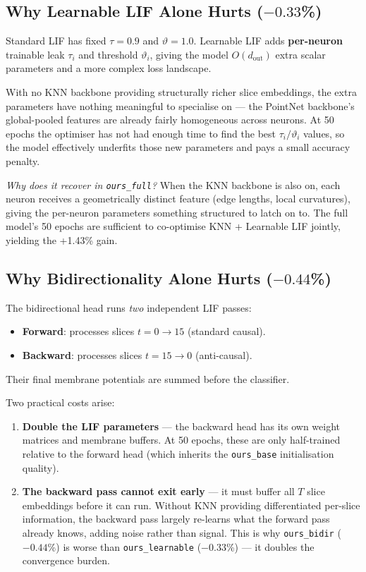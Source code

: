 \documentclass[11pt,a4paper]{article}
\begin{document}
\subsection{Why Learnable LIF Alone Hurts ($-0.33$\%)}

Standard LIF has fixed $\tau = 0.9$ and $\vartheta = 1.0$.
Learnable LIF adds \textbf{per-neuron} trainable leak $\tau_i$ and threshold
$\vartheta_i$, giving the model $O(d_\text{out})$ extra scalar parameters and a
more complex loss landscape.

With no KNN backbone providing structurally richer slice embeddings, the extra
parameters have nothing meaningful to specialise on --- the PointNet backbone's
global-pooled features are already fairly homogeneous across neurons.
At 50 epochs the optimiser has not had enough time to find the best $\tau_i /
\vartheta_i$ values, so the model effectively underfits those new parameters and
pays a small accuracy penalty.

\textit{Why does it recover in \texttt{ours\_full}?}
When the KNN backbone is also on, each neuron receives a geometrically distinct
feature (edge lengths, local curvatures), giving the per-neuron parameters
something structured to latch on to. The full model's 50 epochs are sufficient
to co-optimise KNN + Learnable LIF jointly, yielding the +1.43\% gain.

\subsection{Why Bidirectionality Alone Hurts ($-0.44$\%)}

The bidirectional head runs \emph{two} independent LIF passes:
\begin{itemize}
  \item \textbf{Forward}: processes slices $t = 0 \to 15$ (standard causal).
  \item \textbf{Backward}: processes slices $t = 15 \to 0$ (anti-causal).
\end{itemize}
Their final membrane potentials are summed before the classifier.

Two practical costs arise:

\begin{enumerate}
  \item \textbf{Double the LIF parameters} --- the backward head has its own
        weight matrices and membrane buffers. At 50 epochs, these are only
        half-trained relative to the forward head (which inherits the
        \texttt{ours\_base} initialisation quality).
  \item \textbf{The backward pass cannot exit early} --- it must buffer all
        $T$ slice embeddings before it can run. Without KNN providing
        differentiated per-slice information, the backward pass largely
        re-learns what the forward pass already knows, adding noise rather
        than signal. This is why \texttt{ours\_bidir} ($-0.44$\%) is worse
        than \texttt{ours\_learnable} ($-0.33$\%) --- it doubles the
        convergence burden.
\end{enumerate}
\end{document}
